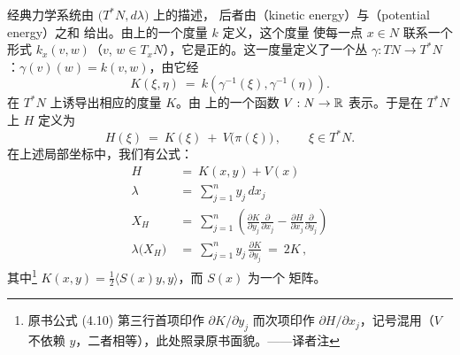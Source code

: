 经典力学系统由 $\bigl(T^{*}N,d\lambda\bigr)$ 上的\trHamiltonianFunction{}描述，%
后者由\textbf{\trKineticEnergy}（kinetic energy）与\textbf{\trPotentialEnergy}（potential energy）之和%
给出。\trKineticEnergy{}由\trConfigurationSpace{}上的一个\trRiemann{}度量 $k$ 定义，这个度量%
使每一点 $x\in N$ 联系一个\trSymmetric\trBilinear{}形式 $k_{x}(v,w)$（$v$,%
$w\in T_{x}N$），它是正的。这一度量定义了一个丛\trIsomorphism{}%
$\gamma:TN\to T^{*}N$：$\gamma(v)(w)=k(v,w)$，由它经
\[
K(\xi,\eta)\ =\ k\left(\gamma^{-1}(\xi),\gamma^{-1}(\eta)\right).
\]
在\trCotangentBundle{} $T^{*}N$ 上诱导出相应的\trRiemann{}度量 $K$。\trPotentialEnergy{}由\trConfigurationSpace{}%
上的一个\trSmooth{}函数 $V:N\to\mathbb{R}$ 表示。于是在 $T^{*}N$ 上\trHamiltonianFunction{}%
$H$ 定义为
\begin{equation}\label{eq:classical-hamiltonian}
H(\xi)\ =\ K(\xi)\ +\ V\bigl(\pi(\xi)\bigr)\,,\qquad\ \xi\in T^{*}N.
\end{equation}
在上述局部坐标中，我们有公式：
\begin{equation}\label{eq:local-formulae}
\begin{aligned}
H\ &=\ K(x,y)+V(x)\\
\lambda\ &=\ \sum_{j=1}^{n}y_{j}\,dx_{j}\\
X_{H}\ &=\ \sum_{j=1}^{n}\left(\frac{\partial K}{\partial y_{j}}\frac{\partial}{\partial x_{j}}-\frac{\partial H}{\partial x_{j}}\frac{\partial}{\partial y_{j}}\right)\\
\lambda\bigl(X_{H}\bigr)\ &=\ \sum_{j=1}^{n}y_{j}\,\frac{\partial K}{\partial y_{j}}\ =\ 2K\,,
\end{aligned}
\end{equation}
其中\footnote{原书公式 (4.10) 第三行首项印作 $\partial K/\partial y_{j}$ 而次项印作 $\partial H/\partial x_{j}$，记号混用（$V$ 不依赖 $y$，二者相等），此处照录原书面貌。——译者注} $K(x,y)=\tfrac{1}{2}\bigl\langle S(x)y,y\bigr\rangle$，而 $S(x)$ 为一个%
\trPositiveDefinite{}矩阵。

